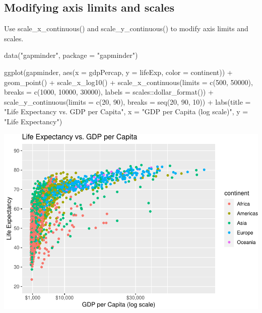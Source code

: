 \documentclass[
]{book}
\newenvironment{Shaded}{\begin{snugshade}}{\end{snugshade}}
\newcommand{\AttributeTok}[1]{\textcolor[rgb]{0.77,0.63,0.00}{#1}}
\newcommand{\DecValTok}[1]{\textcolor[rgb]{0.00,0.00,0.81}{#1}}
\newcommand{\FunctionTok}[1]{\textcolor[rgb]{0.00,0.00,0.00}{#1}}
\newcommand{\NormalTok}[1]{#1}
\newcommand{\SpecialCharTok}[1]{\textcolor[rgb]{0.00,0.00,0.00}{#1}}
\newcommand{\StringTok}[1]{\textcolor[rgb]{0.31,0.60,0.02}{#1}}
\begin{document}
\hypertarget{modifying-axis-limits-and-scales}{%
\subsection{Modifying axis limits and scales}\label{modifying-axis-limits-and-scales}}

Use scale\_x\_continuous() and scale\_y\_continuous() to modify axis limits and scales.

\begin{Shaded}
\begin{Highlighting}[]
\FunctionTok{data}\NormalTok{(}\StringTok{"gapminder"}\NormalTok{, }\AttributeTok{package =} \StringTok{"gapminder"}\NormalTok{)}

\FunctionTok{ggplot}\NormalTok{(gapminder, }\FunctionTok{aes}\NormalTok{(}\AttributeTok{x =}\NormalTok{ gdpPercap, }\AttributeTok{y =}\NormalTok{ lifeExp, }\AttributeTok{color =}\NormalTok{ continent)) }\SpecialCharTok{+}
  \FunctionTok{geom\_point}\NormalTok{() }\SpecialCharTok{+}
  \FunctionTok{scale\_x\_log10}\NormalTok{() }\SpecialCharTok{+}
  \FunctionTok{scale\_x\_continuous}\NormalTok{(}\AttributeTok{limits =} \FunctionTok{c}\NormalTok{(}\DecValTok{500}\NormalTok{, }\DecValTok{50000}\NormalTok{), }\AttributeTok{breaks =} \FunctionTok{c}\NormalTok{(}\DecValTok{1000}\NormalTok{, }\DecValTok{10000}\NormalTok{, }\DecValTok{30000}\NormalTok{), }\AttributeTok{labels =}\NormalTok{ scales}\SpecialCharTok{::}\FunctionTok{dollar\_format}\NormalTok{()) }\SpecialCharTok{+}
  \FunctionTok{scale\_y\_continuous}\NormalTok{(}\AttributeTok{limits =} \FunctionTok{c}\NormalTok{(}\DecValTok{20}\NormalTok{, }\DecValTok{90}\NormalTok{), }\AttributeTok{breaks =} \FunctionTok{seq}\NormalTok{(}\DecValTok{20}\NormalTok{, }\DecValTok{90}\NormalTok{, }\DecValTok{10}\NormalTok{)) }\SpecialCharTok{+}
  \FunctionTok{labs}\NormalTok{(}\AttributeTok{title =} \StringTok{"Life Expectancy vs. GDP per Capita"}\NormalTok{,}
       \AttributeTok{x =} \StringTok{"GDP per Capita (log scale)"}\NormalTok{,}
       \AttributeTok{y =} \StringTok{"Life Expectancy"}\NormalTok{)}
\end{Highlighting}
\end{Shaded}

\includegraphics[width=1\linewidth]{graphformatting_files/figure-latex/unnamed-chunk-14-1}
\end{document}

